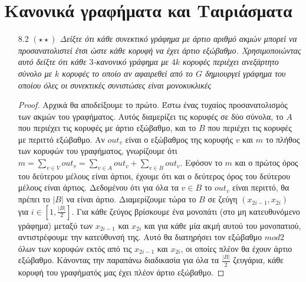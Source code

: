 \documentclass[a4paper, oneside, 11pt]{article}
\theoremstyle{definition}
\begin{document}
\section{Κανονικά γραφήματα και Ταιριάσματα}
\begin{enumerate}
	\item[8.2] \emph{$(\star\star)$ Δείξτε ότι κάθε συνεκτικό γράφημα με άρτιο αριθμό ακμών μπορεί να προσανατολιστεί έτσι ώστε κάθε κορυφή να έχει άρτιο εξώβαθμο.
Χρησιμοποιώντας αυτό δείξτε ότι κάθε $3$-κανονικό γράφημα με $4k$ κορυφές περιέχει ανεξάρτητο σύνολο με $k$ κορυφές το οποίο αν αφαιρεθεί από το $G$ δημιουργεί γράφημα
του οποίου όλες οι συνεκτικές συνιστώσες είναι μονοκυκλικές}

\begin{proof}
Αρχικά θα αποδείξουμε το πρώτο. Έστω ένας τυχαίος προσανατολισμός των ακμών του γραφήματος. Αυτός διαμερίζει τις κορυφές σε δύο σύνολα, το $A$ που περιέχει τις κορυφές με άρτιο
εξώβαθμο, και το $B$ που περιέχει τις κορυφές με περιττό εξώβαθμο. Αν $out_v$ είναι ο εξώβαθμος της κορυφής $v$ και $m$ το πλήθος των κορυφών του γραφήματος, 
γνωρίζουμε ότι $m=\sum_{v\in V} out_v = \sum_{v\in A} out_v + \sum_{v\in B} out_v$. Εφόσον το $m$ και ο πρώτος όρος του δεύτερου μέλους είναι άρτιοι, έχουμε ότι και ο δεύτερος όρος του δεύτερου
μέλους είναι άρτιος. Δεδομένου ότι για όλα τα $v\in B$ το $out_v$ είναι περιττό, θα πρέπει το $|B|$ να είναι άρτιο. Διαμερίζουμε τώρα το $B$ σε ζεύγη $(x_{2i-1},x_{2i})$ για $i\in [1,\frac{|B|}{2}]$.
Για κάθε ζεύγος βρίσκουμε ένα μονοπάτι (στο μη κατευθυνόμενο γράφημα) μεταξύ των $x_{2i-1}$ και $x_{2i}$ και για κάθε μία ακμή αυτού του μονοπατιού, αντιστρέφουμε την κατεύθυνσή της. Αυτό θα διατηρήσει
τον εξώβαθμο $mod 2$ όλων των κορυφών εκτός από τις $x_{2i-1}$ και $x_{2i}$, οι οποίες πλέον θα έχουν άρτιο εξώβαθμο. Κάνοντας την παραπάνω διαδικασία για όλα τα $\frac{|B|}{2}$ ζευγάρια, κάθε κορυφή
του γραφήματός μας έχει πλέον άρτιο εξώβαθμο.
\end{proof}


\end{enumerate}
\end{document}
